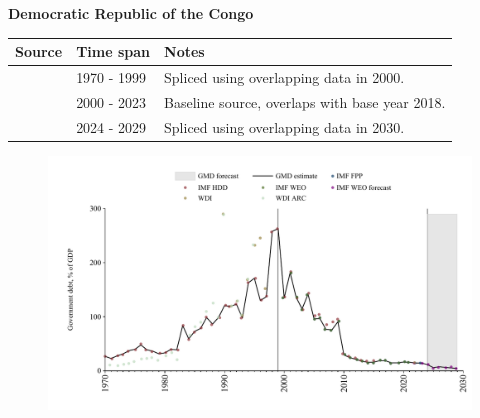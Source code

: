 \documentclass[12pt,a4paper,landscape]{article}
\begin{document}
\begin{adjustbox}{max totalsize={\paperwidth}{\paperheight},center}
\begin{minipage}[t][\textheight][t]{\textwidth}
\vspace*{0.5cm}
{}
\begin{center}
{\Large\bfseries Democratic Republic of the Congo}
\end{center}
\vspace{0.5cm}
\begin{table}[H]
\centering
\small
\begin{tabular}{|l|l|l|}
\hline
\textbf{Source} & \textbf{Time span} & \textbf{Notes} \\
\hline
\rowcolor{white}\cite{IMF_HDD}& 1970 - 1999 &Spliced using overlapping data in 2000.\\
\rowcolor{lightgray}\cite{IMF_FPP}& 2000 - 2023 &Baseline source, overlaps with base year 2018.\\
\rowcolor{white}\cite{IMF_WEO_forecast}& 2024 - 2029 &Spliced using overlapping data in 2030.\\
\hline
\end{tabular}
\end{table}
\begin{figure}[H]
\centering
\includegraphics[width=\textwidth,height=0.6\textheight,keepaspectratio]{graphs/COD_govdebt_GDP.pdf}
\end{figure}
\end{minipage}
\end{adjustbox}
\end{document}
